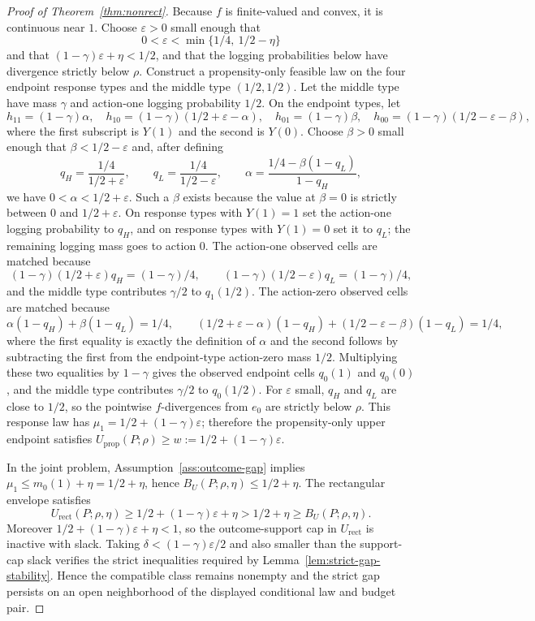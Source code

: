 \documentclass[11pt]{article}
\theoremstyle{definition}
\theoremstyle{plain}
\theoremstyle{remark}
\begin{document}
\begin{proof}[Proof of Theorem~\ref{thm:nonrect}]
Because $f$ is finite-valued and convex, it is continuous near $1$.  Choose
$\varepsilon>0$ small enough that
\[
  0<\varepsilon<\min\{1/4,\ 1/2-\eta\}
\]
and that $(1-\gamma)\varepsilon+\eta<1/2$, and that the logging probabilities
below have divergence strictly below $\rho$.  Construct a propensity-only
feasible law on the four endpoint response types and the middle type
$(1/2,1/2)$.  Let the middle type have mass $\gamma$ and action-one logging
probability $1/2$.  On the endpoint types, let
\[
  h_{11}=(1-\gamma)\alpha,\quad
  h_{10}=(1-\gamma)(1/2+\varepsilon-\alpha),\quad
  h_{01}=(1-\gamma)\beta,\quad
  h_{00}=(1-\gamma)(1/2-\varepsilon-\beta),
\]
where the first subscript is $Y(1)$ and the second is $Y(0)$.  Choose $\beta>0$
small enough that $\beta<1/2-\varepsilon$ and, after defining
\[
  q_H=\frac{1/4}{1/2+\varepsilon},\qquad
  q_L=\frac{1/4}{1/2-\varepsilon},\qquad
  \alpha=\frac{1/4-\beta(1-q_L)}{1-q_H},
\]
we have $0<\alpha<1/2+\varepsilon$.  Such a $\beta$ exists because the value at
$\beta=0$ is strictly between $0$ and $1/2+\varepsilon$.  On response types with
$Y(1)=1$ set the action-one logging probability to $q_H$, and on response types
with $Y(1)=0$ set it to $q_L$; the remaining logging mass goes to action $0$.
The action-one observed cells
are matched because
\[
  (1-\gamma)(1/2+\varepsilon)q_H=(1-\gamma)/4,\qquad
  (1-\gamma)(1/2-\varepsilon)q_L=(1-\gamma)/4,
\]
and the middle type contributes $\gamma/2$ to $q_1(1/2)$.
The action-zero observed cells are matched because
\[
  \alpha(1-q_H)+\beta(1-q_L)=1/4,\qquad
  (1/2+\varepsilon-\alpha)(1-q_H)
    +(1/2-\varepsilon-\beta)(1-q_L)=1/4,
\]
where the first equality is exactly the definition of $\alpha$ and the second
follows by subtracting the first from the endpoint-type action-zero mass
$1/2$.  Multiplying these two equalities by $1-\gamma$ gives the observed
endpoint cells $q_0(1)$ and $q_0(0)$, and the middle type contributes
$\gamma/2$ to $q_0(1/2)$.  For
$\varepsilon$ small, $q_H$ and $q_L$ are close to $1/2$, so the pointwise
$f$-divergences from $e_0$ are strictly below $\rho$.  This response law has
$\mu_1=1/2+(1-\gamma)\varepsilon$; therefore the propensity-only upper endpoint
satisfies
$U_{\mathrm{prop}}(P;\rho)\ge w:=1/2+(1-\gamma)\varepsilon$.

In the joint problem, Assumption~\ref{ass:outcome-gap} implies
$\mu_1\le m_0(1)+\eta=1/2+\eta$, hence
$B_U(P;\rho,\eta)\le1/2+\eta$.  The rectangular envelope satisfies
\[
  U_{\mathrm{rect}}(P;\rho,\eta)
  \ge 1/2+(1-\gamma)\varepsilon+\eta
  > 1/2+\eta
  \ge B_U(P;\rho,\eta).
\]
Moreover $1/2+(1-\gamma)\varepsilon+\eta<1$, so the outcome-support cap in
$U_{\mathrm{rect}}$ is inactive with slack.  Taking
$\delta<(1-\gamma)\varepsilon/2$ and also smaller than the support-cap slack
verifies the strict inequalities required by
Lemma~\ref{lem:strict-gap-stability}.  Hence the compatible class remains
nonempty and the strict gap persists on an open neighborhood of the displayed
conditional law and budget pair.
\end{proof}
\end{document}

